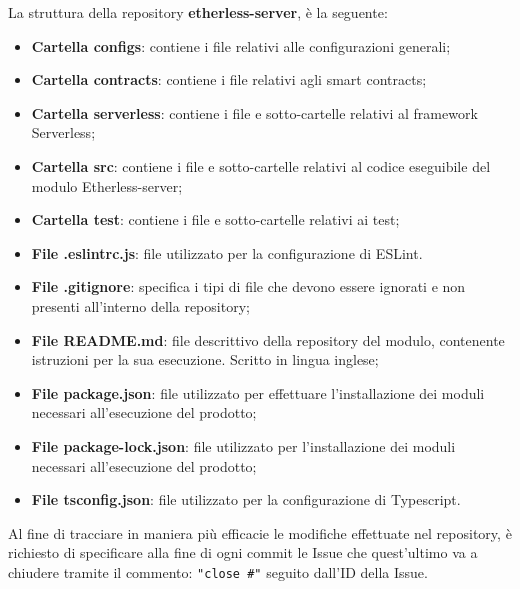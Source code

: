 			La struttura della repository \textbf{etherless-server}, è la seguente:
			\begin{itemize}
				\item \textbf{Cartella configs}: contiene i file relativi alle configurazioni generali;
				\item \textbf{Cartella contracts}: contiene i file relativi agli smart contracts;
				\item \textbf{Cartella serverless}: contiene i file e sotto-cartelle relativi al framework Serverless;
				\item \textbf{Cartella src}: contiene i file e sotto-cartelle relativi al codice eseguibile del modulo Etherless-server;
				\item \textbf{Cartella test}: contiene i file e sotto-cartelle relativi ai test;
				\item \textbf{File .eslintrc.js}: file utilizzato per la configurazione di ESLint.
				\item \textbf{File .gitignore}: specifica i tipi di file che devono essere ignorati e non presenti all'interno della repository;
				\item \textbf{File README.md}: file descrittivo della repository del modulo, contenente istruzioni per la sua esecuzione. Scritto in lingua inglese;
				\item \textbf{File package.json}: file utilizzato per effettuare l'installazione dei moduli necessari all'esecuzione del prodotto;
				\item \textbf{File package-lock.json}: file utilizzato per l'installazione dei moduli necessari all'esecuzione del prodotto;
				\item \textbf{File tsconfig.json}: file utilizzato per la configurazione di Typescript.
			\end{itemize}
			Al fine di tracciare in maniera più efficacie le modifiche effettuate nel repository, è richiesto di specificare alla fine di ogni commit le Issue che quest'ultimo va a chiudere tramite il commento: \texttt{"close \#"} seguito dall'ID della Issue.

